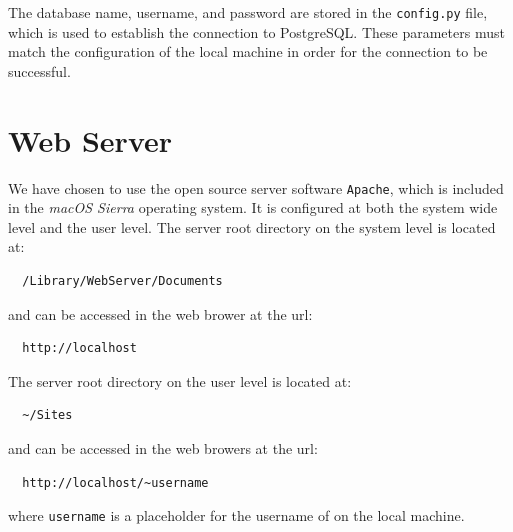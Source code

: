\documentclass[a4paper, 12pt]{report}
\begin{document}
The database name, username, and password are stored in the \texttt{config.py} file, which is used to establish the connection to PostgreSQL. These parameters must match the configuration of the local machine in order for the connection to be successful.

\section{Web Server}
We have chosen to use the open source server software \texttt{Apache}, which is included in the \textit{macOS Sierra} operating system. It is configured at both the system wide level and the user level. The server root directory on the system level is located at:

\begin{verbatim}
  /Library/WebServer/Documents
\end{verbatim}

and can be accessed in the web brower at the url:

\begin{verbatim}
  http://localhost
\end{verbatim}

The server root directory on the user level is located at:

\begin{verbatim}
  ~/Sites
\end{verbatim}

and can be accessed in the web browers at the url:

\begin{verbatim}
  http://localhost/~username
\end{verbatim}

where \texttt{username} is a placeholder for the username of on the local machine.
\end{document}

